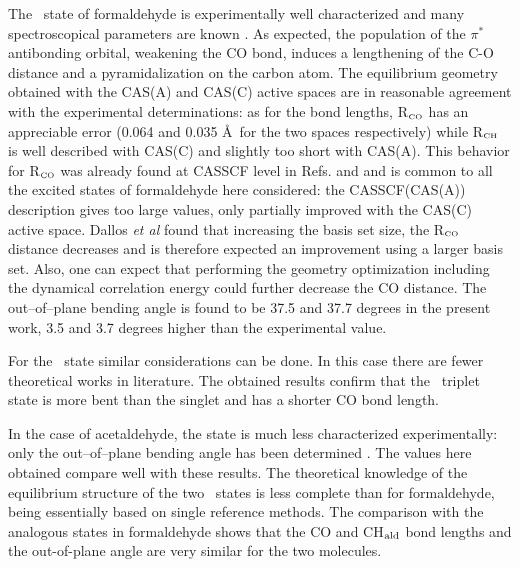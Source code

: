 The \snpi\ state of formaldehyde is experimentally well
characterized and many spectroscopical parameters are known
\cite{jms-94-114-1982,jms-99-294-1983,jms-30-365-1969}.  As expected, the
population of the $\pi^*$ antibonding orbital, weakening the CO bond,
induces a lengthening of the C-O distance and a pyramidalization on the
carbon atom.  The equilibrium geometry obtained with the CAS(A) and CAS(C)
active spaces are in reasonable agreement with the experimental
determinations: as for the bond lengths, R$_{\mbox{\tiny CO}}$ has an
appreciable error (0.064  and 0.035 \AA\ for the two spaces respectively)
while R$_{\mbox{\tiny CH}}$ is well described with CAS(C) and slightly too
short with CAS(A). This behavior for  R$_{\mbox{\tiny CO}}$ was already
found at CASSCF level in Refs.   and
 and is common to
all the excited states of formaldehyde here considered: the CASSCF(CAS(A))
description gives too large values, only partially improved with the CAS(C)
active space. Dallos {\it et al} \cite{jcp-114-746-2001} found that
increasing the basis set size, the R$_{\mbox{\tiny CO}}$ distance decreases and is
therefore expected an improvement using a larger basis set. Also, one
can expect that performing the geometry optimization including the dynamical
correlation energy could further decrease the CO distance.
The out--of--plane bending angle is found to be 37.5 and 37.7 degrees in the present work, 
3.5 and 3.7 degrees higher than the experimental value. 

For the \tnpi\ state similar considerations can be done. In this case there
are fewer theoretical works in literature. The obtained results confirm
that the \npi\ triplet state is more bent than the singlet
\cite{cr-75-67-1975,jpc-97-4293-1993} and has a shorter CO bond length.





In the case of acetaldehyde, the state is much less characterized
experimentally: only the out--of--plane bending angle has been determined
\cite{jcp-105-2547-1996,jpc-98-1519-1994}.  The values here
obtained compare well with these results. The theoretical knowledge of the
equilibrium structure of the two \npi\ states is less complete than for
formaldehyde, being essentially based on single reference methods.  The
comparison with the analogous states in formaldehyde shows that the CO and
CH$_{\rm ald}$ bond lengths and the out-of-plane angle are very similar
for the two molecules.

